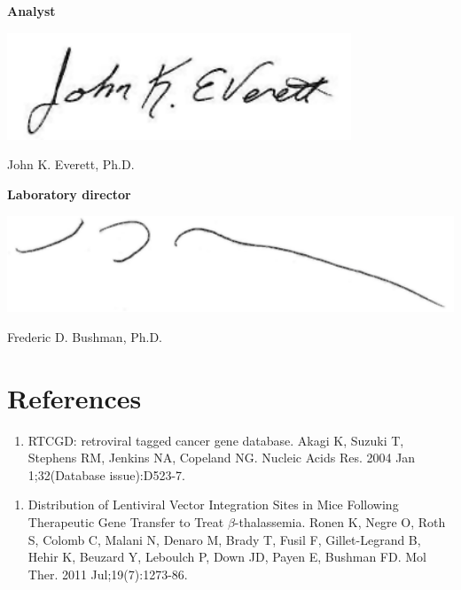 \documentclass[12pt,]{article}
\providecommand{\tightlist}{%
  \setlength{\itemsep}{0pt}\setlength{\parskip}{0pt}}
\begin{document}
\textbf{Analyst}

\includegraphics[width=4.04in]{./data/Everett_signature}

John K. Everett, Ph.D.

\vspace{0.5cm}

\textbf{Laboratory director}

\includegraphics[width=5.99in]{./data/Bushman_signature}

Frederic D. Bushman, Ph.D.

\vspace{2.0cm}

\section{References}\label{references}

\begin{enumerate}
\def\labelenumi{\arabic{enumi}.}
\tightlist
\item
  RTCGD: retroviral tagged cancer gene database. Akagi K, Suzuki T,
  Stephens RM, Jenkins NA, Copeland NG. Nucleic Acids Res. 2004 Jan
  1;32(Database issue):D523-7.
\end{enumerate}

\vspace{0.1cm}

\begin{enumerate}
\def\labelenumi{\arabic{enumi}.}
\setcounter{enumi}{1}
\tightlist
\item
  Distribution of Lentiviral Vector Integration Sites in Mice Following
  Therapeutic Gene Transfer to Treat \(\beta\)-thalassemia. Ronen K,
  Negre O, Roth S, Colomb C, Malani N, Denaro M, Brady T, Fusil F,
  Gillet-Legrand B, Hehir K, Beuzard Y, Leboulch P, Down JD, Payen E,
  Bushman FD. Mol Ther. 2011 Jul;19(7):1273-86.
\end{enumerate}
\end{document}
